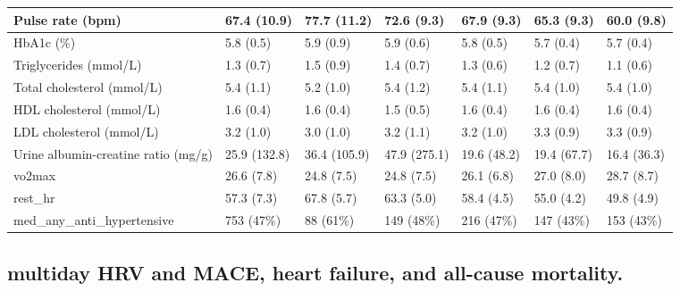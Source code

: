 \documentclass[
  a4paper,
  headsepline=true,
  open=any]{scrbook}
\begin{document}
\begin{table}
{\begin{tabular}{l|l|l|l|l|l|l}
\hline
Pulse rate (bpm) & 67.4 (10.9) & 77.7 (11.2) & 72.6 (9.3) & 67.9 (9.3) & 65.3 (9.3) & 60.0 (9.8)\\
\hline
HbA1c (\%) & 5.8 (0.5) & 5.9 (0.9) & 5.9 (0.6) & 5.8 (0.5) & 5.7 (0.4) & 5.7 (0.4)\\
\hline
Triglycerides (mmol/L) & 1.3 (0.7) & 1.5 (0.9) & 1.4 (0.7) & 1.3 (0.6) & 1.2 (0.7) & 1.1 (0.6)\\
\hline
Total cholesterol (mmol/L) & 5.4 (1.1) & 5.2 (1.0) & 5.4 (1.2) & 5.4 (1.1) & 5.4 (1.0) & 5.4 (1.0)\\
\hline
HDL cholesterol (mmol/L) & 1.6 (0.4) & 1.6 (0.4) & 1.5 (0.5) & 1.6 (0.4) & 1.6 (0.4) & 1.6 (0.4)\\
\hline
LDL cholesterol (mmol/L) & 3.2 (1.0) & 3.0 (1.0) & 3.2 (1.1) & 3.2 (1.0) & 3.3 (0.9) & 3.3 (0.9)\\
\hline
Urine albumin-creatine ratio (mg/g) & 25.9 (132.8) & 36.4 (105.9) & 47.9 (275.1) & 19.6 (48.2) & 19.4 (67.7) & 16.4 (36.3)\\
\hline
vo2max & 26.6 (7.8) & 24.8 (7.5) & 24.8 (7.5) & 26.1 (6.8) & 27.0 (8.0) & 28.7 (8.7)\\
\hline
rest\_hr & 57.3 (7.3) & 67.8 (5.7) & 63.3 (5.0) & 58.4 (4.5) & 55.0 (4.2) & 49.8 (4.9)\\
\hline
med\_any\_anti\_hypertensive & 753 (47\%) & 88 (61\%) & 149 (48\%) & 216 (47\%) & 147 (43\%) & 153 (43\%)\\
\hline
\end{tabular}}
\end{table}

\hypertarget{multiday-hrv-and-mace-heart-failure-and-all-cause-mortality.}{%
\subsection{multiday HRV and MACE, heart failure, and all-cause
mortality.}\label{multiday-hrv-and-mace-heart-failure-and-all-cause-mortality.}}
\end{document}

